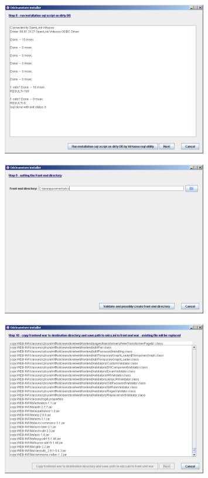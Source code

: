 \FloatBarrier

\begin{figure}[!h]
    \centering
    \includegraphics[width=0.8\textwidth]{images/install-step08.png}
\end{figure}

\FloatBarrier

\begin{figure}[!h]
    \centering
    \includegraphics[width=0.8\textwidth]{images/install-step09.png}
\end{figure}

\FloatBarrier

\begin{figure}[!h]
    \centering
    \includegraphics[width=0.8\textwidth]{images/install-step10.png}
\end{figure}

